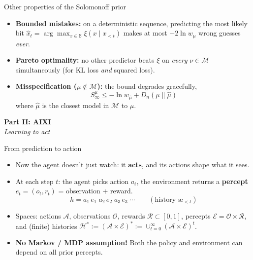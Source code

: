 \documentclass[10pt,aspectratio=169]{beamer}
\newcommand{\cA}{\mathcal{A}}
\newcommand{\cO}{\mathcal{O}}
\newcommand{\cR}{\mathcal{R}}
\newcommand{\cE}{\mathcal{E}}
\newcommand{\cH}{\mathcal{H}}
\newcommand{\cM}{\mathcal{M}}
\newcommand{\B}{\mathbb{B}}
\newcommand{\aes}{{\text{\ae}}}            %
\begin{document}
\begin{frame}{Other properties of the Solomonoff prior}
\begin{itemize}
    \item \textbf{Bounded mistakes:} on a deterministic sequence, predicting the
    most likely bit $\hat{x}_t = \arg\max_{x \in \B} \xi(x \mid x_{<t})$ makes at most $-2\ln w_\mu$ wrong guesses \emph{ever}.
    \pause
    \item \textbf{Pareto optimality:} no other predictor beats $\xi$ on \emph{every} $\nu\in\cM$
    simultaneously (for KL loss \emph{and} squared loss).
    \pause
    \item \textbf{Misspecification ($\mu \notin \cM$):} the bound degrades gracefully,
    \[
    S^\mu_\infty \leq -\ln w_{\hat\mu} +  D_n(\mu \parallel \hat\mu)  
    \]
    where $\hat\mu$ is the closest model in $\cM$ to $\mu$.
\end{itemize}
\end{frame}

\begin{frame}
\begin{center}
{\Huge \textbf{Part II: AIXI}}\\[1em]
{\large \emph{Learning to act}}\\[2em]
\end{center}
\end{frame}

\begin{frame}{From prediction to action}
\begin{itemize}
    \item Now the agent doesn't just watch: it \textbf{acts}, and its actions shape what it sees.
    \pause
    \item At each step $t$: the agent picks action $a_t$, the environment returns a
    \textbf{percept} $e_t=(o_t,r_t)$ = observation $+$ reward.
    \[
    h = a_1\, e_1 \; a_2\, e_2 \; a_3\, e_3 \;\cdots \qquad
    (\text{history } \aes_{<t})
    \]
    \pause
    \item Spaces: actions $\cA$, observations $\cO$, rewards $\cR \subset [0,1]$, percepts $\cE=\cO\times\cR$,
    and (finite) histories $\cH^* := (\cA \times \cE)^* := \cup_{t=0}^\infty (\cA \times \cE)^t$.
    \pause
    \item \textbf{No Markov / MDP assumption!} Both the policy and environment can depend on all prior percepts.
\end{itemize}
\end{frame}
\end{document}
